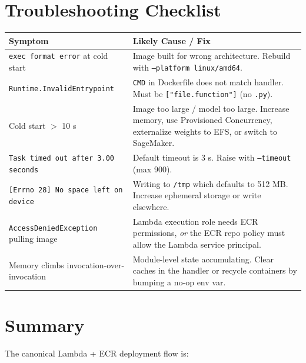 \documentclass[11pt,a4paper]{article}
\begin{document}
\section{Troubleshooting Checklist}

\begin{longtable}{p{5.5cm} p{9.2cm}}
\toprule
\textbf{Symptom} & \textbf{Likely Cause / Fix} \\
\midrule
\texttt{exec format error} at cold start &
Image built for wrong architecture. Rebuild with
\texttt{--platform linux/amd64}. \\
\addlinespace
\texttt{Runtime.InvalidEntrypoint} &
\texttt{CMD} in Dockerfile does not match handler.
Must be \texttt{["file.function"]} (no \texttt{.py}). \\
\addlinespace
Cold start $>$ 10 s &
Image too large / model too large. Increase memory, use Provisioned
Concurrency, externalize weights to EFS, or switch to SageMaker. \\
\addlinespace
\texttt{Task timed out after 3.00 seconds} &
Default timeout is 3 s. Raise with \texttt{--timeout} (max 900). \\
\addlinespace
\texttt{[Errno 28] No space left on device} &
Writing to \texttt{/tmp} which defaults to 512 MB. Increase ephemeral
storage or write elsewhere. \\
\addlinespace
\texttt{AccessDeniedException} pulling image &
Lambda execution role needs ECR permissions, \emph{or} the ECR repo
policy must allow the Lambda service principal. \\
\addlinespace
Memory climbs invocation-over-invocation &
Module-level state accumulating. Clear caches in the handler or
recycle containers by bumping a no-op env var. \\
\bottomrule
\end{longtable}

\section{Summary}

The canonical Lambda + ECR deployment flow is:
\end{document}
